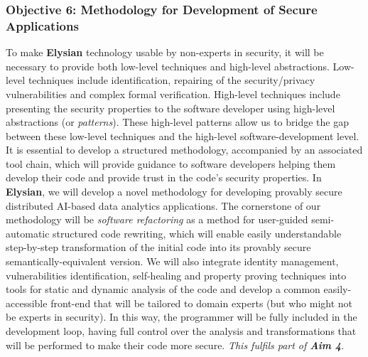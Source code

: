 \documentclass[a4paper,11pt]{article}
\newcommand{\project}[1]{\textbf{#1}\xspace}
\newcommand{\SECURITY}{\project{Elysian}}
\newcommand{\TheProject}{\SECURITY}
\begin{document}
\subsubsection*{Objective 6: Methodology for Development of Secure Applications}
\vspace{-6pt}

To make \TheProject{} technology usable by non-experts in security, it will be necessary to provide both low-level techniques and high-level abstractions. Low-level techniques include identification, repairing of the security/privacy vulnerabilities and complex formal verification. High-level techniques include presenting the security properties to the software developer using high-level abstractions (or \emph{patterns}). These high-level patterns allow us to bridge the gap between these low-level techniques and the high-level software-development level. It is essential to develop a structured methodology, accompanied by an associated tool chain, which will provide guidance to software developers helping them develop their code and provide trust in the code's security properties. In \TheProject{}, we will develop a novel methodology for developing provably secure distributed AI-based data analytics applications. The cornerstone of our methodology will be \emph{software refactoring} as a method for user-guided semi-automatic structured code rewriting, %
which will enable easily understandable step-by-step transformation of the initial code into its provably secure semantically-equivalent version. We will also integrate identity management, vulnerabilities identification, self-healing and property proving techniques into tools for static and dynamic analysis of the code and develop a common easily-accessible front-end that will be tailored to domain experts (but who might not be experts in security). In this way, the programmer will be fully included in the development loop, having full control over the analysis and transformations that will be performed to make their code more secure. %
\emph{This fulfils part of \textbf{Aim 4}}.
\end{document}
